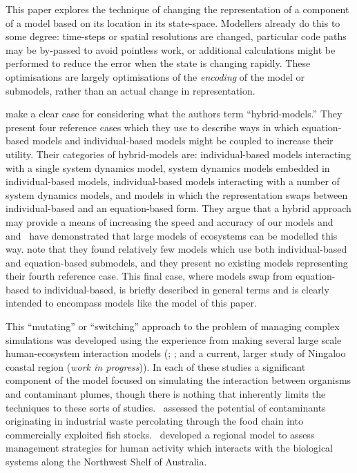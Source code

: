 This paper explores the technique of changing the representation of a
component of a model based on its location in its state-space. Modellers
already do this to some degree: time-steps or spatial resolutions are changed,
particular code paths may be by-passed to avoid pointless work, or additional
calculations might be performed to reduce the error when the state is changing
rapidly. These optimisations are largely optimisations of the
\emph{encoding\/} of the model or submodels, rather than an actual change in
representation.

 make a clear case for considering what the authors term
``hybrid-models.'' They present four reference cases which they use to
describe ways in which equation-based models and individual-based models might
be coupled to increase their utility. Their categories of hybrid-models are:
individual-based models interacting with a single system dynamics model,
system dynamics models embedded in individual-based models, individual-based
models interacting with a number of system dynamics models, and models in
which the representation swaps between individual-based and an equation-based
form. They argue that a hybrid approach may provide a means of increasing the
speed and accuracy of our models and~\citet{Lyne94:1} and~\citet{gray2006nws} have
demonstrated that large models of ecosystems can be modelled this way.
 note that they found relatively few models which use both
individual-based and equation-based submodels, and they present no existing
models representing their fourth reference case. This final case, where models
swap from equation-based to individual-based, is briefly described in general
terms and is clearly intended to encompass models like the model of this
paper.

This ``mutating'' or ``switching'' approach to the problem of managing
complex simulations was developed using the experience from making several
large scale human-ecosystem interaction models (\citeauthor{Lyne94:1};
\citeauthor{gray2006nws}; and a current, larger study of Ningaloo coastal region
({\em{work in progress}\/})). In each of these studies a significant component
of the model focused on simulating the interaction between organisms and
contaminant plumes, though there is nothing that inherently limits the
techniques to these sorts of studies.~\citeauthor{Lyne94:1} assessed the
potential of contaminants originating in industrial waste percolating through
the food chain into commercially exploited fish stocks.~\citeauthor{gray2006nws}
developed a regional model to assess management strategies for human activity
which interacts with the biological systems along the Northwest Shelf of
Australia.

